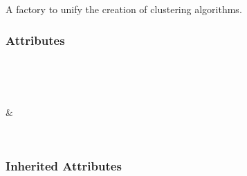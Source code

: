 \documentclass[letterpaper,10pt,english]{sphinxmanual}
\begin{document}
\begin{fulllineitems}
\label{\detokenize{api/generated/directional_clustering.clustering.ClusteringFactory:directional_clustering.clustering.ClusteringFactory}}
A factory to unify the creation of clustering algorithms.
\subsubsection*{Attributes}


\begin{savenotes}\sphinxatlongtablestart\begin{longtable}[c]{}
\hline

\endfirsthead

%
{}\\
\hline

\endhead

\hline
{}\\
\endfoot

\endlastfoot

&

\\
\hline
\end{longtable}\sphinxatlongtableend\end{savenotes}
\subsubsection*{Inherited Attributes}


\begin{savenotes}\sphinxatlongtablestart\begin{longtable}[c]{}
\hline

\endfirsthead

%
{}\\
\hline

\endhead

\hline
{}\\
\endfoot


\end{longtable}
\end{savenotes}
\end{fulllineitems}
\end{document}
